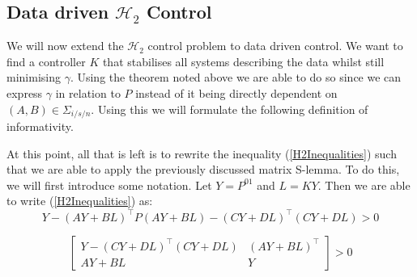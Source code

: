 


\subsection{Data driven $\mathcal{H}_2$ Control}
We will now extend the $\mathcal{H}_2$ control problem to data driven control. We want to find a controller $K$ that stabilises all systems describing the data whilst still minimising $\gamma$. Using the theorem noted above we are able to do so since we can express $\gamma$ in relation to $P$ instead of it being directly dependent on $(A,B) \in \Sigma_{i/s/n}$. Using this we will formulate the following definition of informativity.


At this point, all that is left is to rewrite the inequality (\ref{H2Inequalities}) such that we are able to apply the previously discussed matrix S-lemma. To do this, we will first introduce some notation. Let $Y = P^{01}$ and $L = KY$. Then we are able to write (\ref{H2Inequalities}) as:
\begin{equation*}
	Y - (AY + BL)^\top P (AY + BL) - (CY + DL)^\top (CY+DL) > 0
\end{equation*}


\begin{equation} \label{H2AfterSchur}
	\begin{bmatrix} Y - (CY + DL)^\top(CY + DL) & (AY + BL)^\top \\ AY + BL & Y \end{bmatrix} > 0
\end{equation}

